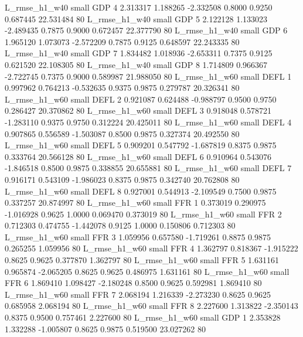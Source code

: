  L_rmse_h1_w40      small      GDP                 4 2.313317 1.188265 -2.332508 0.8000 0.9250  0.687445   22.531484 80
 L_rmse_h1_w40      small      GDP                 5 2.122128 1.133023 -2.489435 0.7875 0.9000  0.672457   22.377790 80
 L_rmse_h1_w40      small      GDP                 6 1.965120 1.073073 -2.572209 0.7875 0.9125  0.648597   22.243335 80
 L_rmse_h1_w40      small      GDP                 7 1.834482 1.018936 -2.653311 0.7375 0.9125  0.621520   22.108305 80
 L_rmse_h1_w40      small      GDP                 8 1.714809 0.966367 -2.722745 0.7375 0.9000  0.589987   21.988050 80
 L_rmse_h1_w60      small     DEFL                 1 0.997962 0.764213 -0.532635 0.9375 0.9875  0.279787   20.326341 80
 L_rmse_h1_w60      small     DEFL                 2 0.921087 0.624488 -0.988797 0.9500 0.9750  0.286427   20.370862 80
 L_rmse_h1_w60      small     DEFL                 3 0.918048 0.578721 -1.283110 0.9375 0.9750  0.312224   20.425011 80
 L_rmse_h1_w60      small     DEFL                 4 0.907865 0.556589 -1.503087 0.8500 0.9875  0.327374   20.492550 80
 L_rmse_h1_w60      small     DEFL                 5 0.909201 0.547792 -1.687819 0.8375 0.9875  0.333764   20.566128 80
 L_rmse_h1_w60      small     DEFL                 6 0.910964 0.543076 -1.846518 0.8500 0.9875  0.338855   20.655881 80
 L_rmse_h1_w60      small     DEFL                 7 0.916171 0.543109 -1.986023 0.8375 0.9875  0.342740   20.762808 80
 L_rmse_h1_w60      small     DEFL                 8 0.927001 0.544913 -2.109549 0.7500 0.9875  0.337257   20.874997 80
 L_rmse_h1_w60      small      FFR                 1 0.373019 0.290975 -1.016928 0.9625 1.0000  0.069470    0.373019 80
 L_rmse_h1_w60      small      FFR                 2 0.712303 0.474755 -1.442078 0.9125 1.0000  0.150806    0.712303 80
 L_rmse_h1_w60      small      FFR                 3 1.059956 0.657580 -1.719261 0.8875 0.9875  0.265255    1.059956 80
 L_rmse_h1_w60      small      FFR                 4 1.362797 0.818367 -1.915222 0.8625 0.9625  0.377870    1.362797 80
 L_rmse_h1_w60      small      FFR                 5 1.631161 0.965874 -2.065205 0.8625 0.9625  0.486975    1.631161 80
 L_rmse_h1_w60      small      FFR                 6 1.869410 1.098427 -2.180248 0.8500 0.9625  0.592981    1.869410 80
 L_rmse_h1_w60      small      FFR                 7 2.068194 1.216339 -2.273230 0.8625 0.9625  0.685958    2.068194 80
 L_rmse_h1_w60      small      FFR                 8 2.227600 1.313822 -2.350143 0.8375 0.9500  0.757461    2.227600 80
 L_rmse_h1_w60      small      GDP                 1 2.353828 1.332288 -1.005807 0.8625 0.9875  0.519500   23.027262 80
